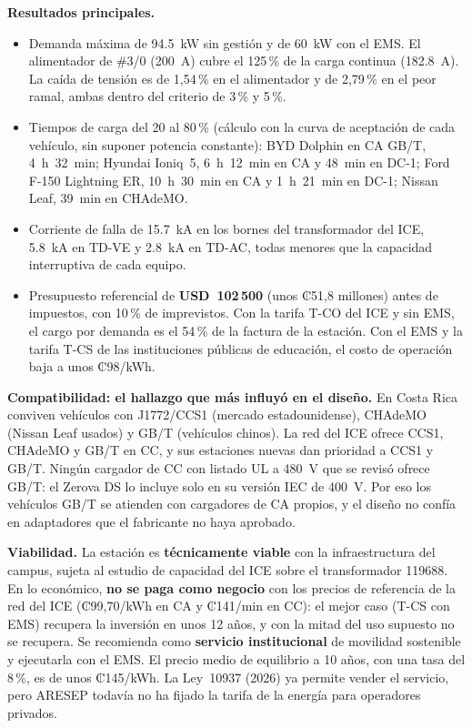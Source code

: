 \textbf{Resultados principales.}
\begin{itemize}
\item Demanda máxima de \SI{94.5}{\kilo\watt} sin gestión y de \SI{60}{\kilo\watt} con el EMS. El alimentador de \#3/0 (\SI{200}{\ampere}) cubre el 125\,\% de la carga continua (\SI{182.8}{\ampere}). La caída de tensión es de 1,54\,\% en el alimentador y de 2,79\,\% en el peor ramal, ambas dentro del criterio de 3\,\% y 5\,\%.
\item Tiempos de carga del 20 al 80\,\% (cálculo con la curva de aceptación de cada vehículo, sin suponer potencia constante): BYD Dolphin en CA GB/T, 4~h~32~min; Hyundai Ioniq~5, 6~h~12~min en CA y 48~min en DC-1; Ford F-150 Lightning ER, 10~h~30~min en CA y 1~h~21~min en DC-1; Nissan Leaf, 39~min en CHAdeMO.
\item Corriente de falla de \SI{15.7}{\kilo\ampere} en los bornes del transformador del ICE, \SI{5.8}{\kilo\ampere} en TD-VE y \SI{2.8}{\kilo\ampere} en TD-AC, todas menores que la capacidad interruptiva de cada equipo.
\item Presupuesto referencial de \textbf{USD~102\,500} (unos ₡51,8 millones) antes de impuestos, con 10\,\% de imprevistos. Con la tarifa T-CO del ICE y sin EMS, el cargo por demanda es el 54\,\% de la factura de la estación. Con el EMS y la tarifa T-CS de las instituciones públicas de educación, el costo de operación baja a unos ₡98/kWh.
\end{itemize}

\textbf{Compatibilidad: el hallazgo que más influyó en el diseño.} En Costa Rica conviven vehículos con J1772/CCS1 (mercado estadounidense), CHAdeMO (Nissan Leaf usados) y GB/T (vehículos chinos). La red del ICE ofrece CCS1, CHAdeMO y GB/T en CC, y sus estaciones nuevas dan prioridad a CCS1 y GB/T. Ningún cargador de CC con listado UL a 480~V que se revisó ofrece GB/T: el Zerova DS lo incluye solo en su versión IEC de 400~V. Por eso los vehículos GB/T se atienden con cargadores de CA propios, y el diseño no confía en adaptadores que el fabricante no haya aprobado.

\textbf{Viabilidad.} La estación es \textbf{técnicamente viable} con la infraestructura del campus, sujeta al estudio de capacidad del ICE sobre el transformador 119688. En lo económico, \textbf{no se paga como negocio} con los precios de referencia de la red del ICE (₡99,70/kWh en CA y ₡141/min en CC): el mejor caso (T-CS con EMS) recupera la inversión en unos 12 años, y con la mitad del uso supuesto no se recupera. Se recomienda como \textbf{servicio institucional} de movilidad sostenible y ejecutarla con el EMS. El precio medio de equilibrio a 10 años, con una tasa del 8\,\%, es de unos ₡145/kWh. La Ley~10937 (2026) ya permite vender el servicio, pero ARESEP todavía no ha fijado la tarifa de la energía para operadores privados.

